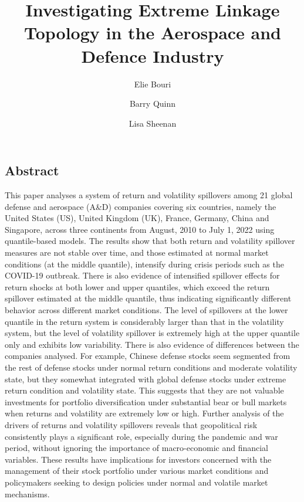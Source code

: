 \documentclass[
  letterpaper,
  DIV=11,
  numbers=noendperiod]{scrartcl}
\title{Investigating Extreme Linkage Topology in the Aerospace and
Defence Industry}
\author{Elie Bouri \and Barry Quinn \and Lisa Sheenan}
\date{}
\begin{document}
\maketitle
\ifdefined\Shaded\renewenvironment{Shaded}{\begin{tcolorbox}[sharp corners, interior hidden, enhanced, borderline west={3pt}{0pt}{shadecolor}, boxrule=0pt, breakable, frame hidden]}{\end{tcolorbox}}\fi

\hypertarget{abstract}{%
\subsection*{Abstract}\label{abstract}}

This paper analyses a system of return and volatility spillovers among
21 global defense and aerospace (A\&D) companies covering six countries,
namely the United States (US), United Kingdom (UK), France, Germany,
China and Singapore, across three continents from August, 2010 to July
1, 2022 using quantile-based models. The results show that both return
and volatility spillover measures are not stable over time, and those
estimated at normal market conditions (at the middle quantile),
intensify during crisis periods such as the COVID-19 outbreak. There is
also evidence of intensified spillover effects for return shocks at both
lower and upper quantiles, which exceed the return spillover estimated
at the middle quantile, thus indicating significantly different behavior
across different market conditions. The level of spillovers at the lower
quantile in the return system is considerably larger than that in the
volatility system, but the level of volatility spillover is extremely
high at the upper quantile only and exhibits low variability. There is
also evidence of differences between the companies analysed. For
example, Chinese defense stocks seem segmented from the rest of defense
stocks under normal return conditions and moderate volatility state, but
they somewhat integrated with global defense stocks under extreme return
condition and volatility state. This suggests that they are not valuable
investments for portfolio diversification under substantial bear or bull
markets when returns and volatility are extremely low or high. Further
analysis of the drivers of returns and volatility spillovers reveals
that geopolitical risk consistently plays a significant role, especially
during the pandemic and war period, without ignoring the importance of
macro-economic and financial variables. These results have implications
for investors concerned with the management of their stock portfolio
under various market conditions and policymakers seeking to design
policies under normal and volatile market mechanisms.
\end{document}
